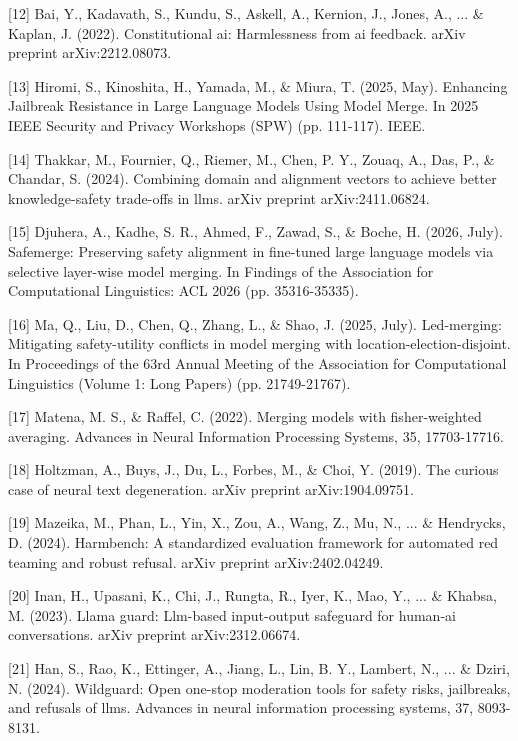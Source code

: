 [12] Bai, Y., Kadavath, S., Kundu, S., Askell, A., Kernion, J., Jones, A., ... \& Kaplan, J. (2022). Constitutional ai: Harmlessness from ai feedback. arXiv preprint arXiv:2212.08073.

[13] Hiromi, S., Kinoshita, H., Yamada, M., \& Miura, T. (2025, May). Enhancing Jailbreak Resistance in Large Language Models Using Model Merge. In 2025 IEEE Security and Privacy Workshops (SPW) (pp. 111-117). IEEE.

[14] Thakkar, M., Fournier, Q., Riemer, M., Chen, P. Y., Zouaq, A., Das, P., \& Chandar, S. (2024). Combining domain and alignment vectors to achieve better knowledge-safety trade-offs in llms. arXiv preprint arXiv:2411.06824.

[15] Djuhera, A., Kadhe, S. R., Ahmed, F., Zawad, S., \& Boche, H. (2026, July). Safemerge: Preserving safety alignment in fine-tuned large language models via selective layer-wise model merging. In Findings of the Association for Computational Linguistics: ACL 2026 (pp. 35316-35335).

[16] Ma, Q., Liu, D., Chen, Q., Zhang, L., \& Shao, J. (2025, July). Led-merging: Mitigating safety-utility conflicts in model merging with location-election-disjoint. In Proceedings of the 63rd Annual Meeting of the Association for Computational Linguistics (Volume 1: Long Papers) (pp. 21749-21767).

[17] Matena, M. S., \& Raffel, C. (2022). Merging models with fisher-weighted averaging. Advances in Neural Information Processing Systems, 35, 17703-17716.

[18] Holtzman, A., Buys, J., Du, L., Forbes, M., \& Choi, Y. (2019). The curious case of neural text degeneration. arXiv preprint arXiv:1904.09751.

[19] Mazeika, M., Phan, L., Yin, X., Zou, A., Wang, Z., Mu, N., ... \& Hendrycks, D. (2024). Harmbench: A standardized evaluation framework for automated red teaming and robust refusal. arXiv preprint arXiv:2402.04249.

[20] Inan, H., Upasani, K., Chi, J., Rungta, R., Iyer, K., Mao, Y., ... \& Khabsa, M. (2023). Llama guard: Llm-based input-output safeguard for human-ai conversations. arXiv preprint arXiv:2312.06674.

[21] Han, S., Rao, K., Ettinger, A., Jiang, L., Lin, B. Y., Lambert, N., ... \& Dziri, N. (2024). Wildguard: Open one-stop moderation tools for safety risks, jailbreaks, and refusals of llms. Advances in neural information processing systems, 37, 8093-8131.

